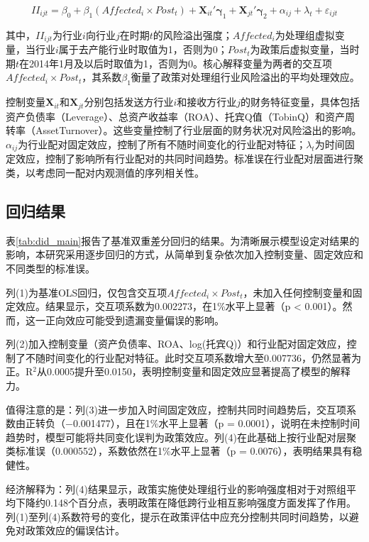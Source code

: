 \begin{equation}
\label{eq:did_baseline}
II_{ijt} = \beta_0 + \beta_1 (Affected_i \times Post_t) + \bm{X}_{it}'\bm{\gamma}_1 + \bm{X}_{jt}'\bm{\gamma}_2 + \alpha_{ij} + \lambda_t + \varepsilon_{ijt}
\end{equation}

其中，$II_{ijt}$为行业$i$向行业$j$在时期$t$的风险溢出强度；$Affected_i$为处理组虚拟变量，当行业$i$属于去产能行业时取值为1，否则为0；$Post_t$为政策后虚拟变量，当时期$t$在2014年1月及以后时取值为1，否则为0。核心解释变量为两者的交互项$Affected_i \times Post_t$，其系数$\beta_1$衡量了政策对处理组行业风险溢出的平均处理效应。

控制变量$\bm{X}_{it}$和$\bm{X}_{jt}$分别包括发送方行业$i$和接收方行业$j$的财务特征变量，具体包括资产负债率（Leverage）、总资产收益率（ROA）、托宾Q值（TobinQ）和资产周转率（AssetTurnover）。这些变量控制了行业层面的财务状况对风险溢出的影响。$\alpha_{ij}$为行业配对固定效应，控制了所有不随时间变化的行业配对特征；$\lambda_t$为时间固定效应，控制了影响所有行业配对的共同时间趋势。标准误在行业配对层面进行聚类，以考虑同一配对内观测值的序列相关性\citep{bertrand2004much}。

\subsection{回归结果}

表\ref{tab:did_main}报告了基准双重差分回归的结果。为清晰展示模型设定对结果的影响，本研究采用逐步回归的方式，从简单到复杂依次加入控制变量、固定效应和不同类型的标准误。

列(1)为基准OLS回归，仅包含交互项$Affected_i \times Post_t$，未加入任何控制变量和固定效应。结果显示，交互项系数为0.002273，在1\%水平上显著（p < 0.001）。然而，这一正向效应可能受到遗漏变量偏误的影响。

列(2)加入控制变量（资产负债率、ROA、log(托宾Q)）和行业配对固定效应，控制了不随时间变化的行业配对特征。此时交互项系数增大至0.007736，仍然显著为正。R$^2$从0.0005提升至0.0150，表明控制变量和固定效应显著提高了模型的解释力。

值得注意的是：列(3)进一步加入时间固定效应，控制共同时间趋势后，交互项系数由正转负（$-$0.001477），且在1\%水平上显著（p = 0.0001），说明在未控制时间趋势时，模型可能将共同变化误判为政策效应。列(4)在此基础上按行业配对层聚类标准误（0.000552），系数依然在1\%水平上显著（p = 0.0076），表明结果具有稳健性。

经济解释为：列(4)结果显示，政策实施使处理组行业的影响强度相对于对照组平均下降约0.148个百分点，表明政策在降低跨行业相互影响强度方面发挥了作用。列(1)至列(4)系数符号的变化，提示在政策评估中应充分控制共同时间趋势，以避免对政策效应的偏误估计。

